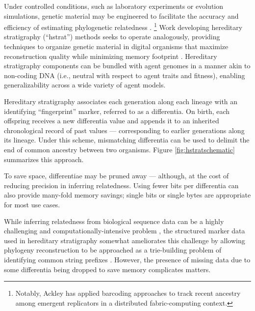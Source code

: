 


Under controlled conditions, such as laboratory experiments or evolution simulations, genetic material may be engineered to facilitate the accuracy and efficiency of estimating phylogenetic relatedness \citep{li2024reconstructing,ackley2023robust}.%
\footnote{Notably, Ackley has applied barcoding approaches to track recent ancestry among emergent replicators in a distributed fabric-computing context.}
Work developing hereditary stratigraphy (``hstrat'') methods seeks to operate analogously, providing techniques to organize genetic material in digital organisms that maximize reconstruction quality while minimizing memory footprint \citep{moreno2022hereditary}.
Hereditary stratigraphy components can be bundled with agent genomes in a manner akin to non-coding DNA (i.e., neutral with respect to agent traits and fitness), enabling generalizability across a wide variety of agent models.

Hereditary stratigraphy associates each generation along each lineage with an identifying ``fingerprint'' marker, referred to as a differentia.
On birth, each offspring receives a new differentia value and appends it to an inherited chronological record of past values --- corresponding to earlier generations along its lineage.
Under this scheme, mismatching differentia can be used to delimit the end of common ancestry between two organisms.
Figure \ref{fig:hstratschematic} summarizes this approach.

To save space, differentiae may be pruned away --- although, at the cost of reducing precision in inferring relatedness.
Using fewer bits per differentia can also provide many-fold memory savings; single bits or single bytes are appropriate for most use cases.

While inferring relatedness from biological sequence data can be a highly challenging and computationally-intensive problem \citep{miller2010creating},
the structured marker data used in hereditary stratigraphy somewhat ameliorates this challenge by allowing phylogeny reconstruction to be approached as a trie-building problem of identifying common string prefixes \citep{delabriandais1959file,moreno2024analysis}.
However, the presence of missing data due to some differentia being dropped to save memory complicates matters.

